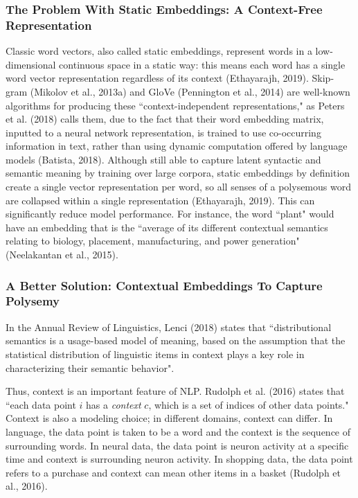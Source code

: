 \subsubsection{The Problem With Static Embeddings: A Context-Free Representation}

Classic word vectors, also called static embeddings, represent words in a low-dimensional continuous space in a static way: this means each word has a single word vector representation regardless of its context (Ethayarajh, 2019). Skip-gram (Mikolov et al., 2013a) and GloVe (Pennington et al., 2014) are well-known algorithms for producing these ``context-independent representations," as Peters et al. (2018) calls them, due to the fact that their word embedding matrix, inputted to a neural network representation, is trained to use co-occurring information in text, rather than using dynamic computation offered by language models (Batista, 2018). Although still able to capture latent syntactic and semantic meaning by training over large corpora, static embeddings by definition create a single vector representation per word, so all senses of a polysemous word are collapsed within a single representation (Ethayarajh, 2019). This can significantly reduce model performance. For instance, the word ``plant" would have an embedding that is the ``average of its different contextual semantics relating to biology, placement, manufacturing, and power generation" (Neelakantan et al., 2015). 

\subsubsection{A Better Solution: Contextual Embeddings To Capture Polysemy}

In the Annual Review of Linguistics, Lenci (2018) states that ``distributional semantics is a usage-based model of meaning, based on the assumption that the statistical distribution of linguistic items in context plays a key role in characterizing their semantic behavior".

Thus, context is an important feature of NLP. Rudolph et al. (2016) states that ``each data point $i$ has a \emph{context} $c$, which is a set of indices of other data points." Context is also a modeling choice; in different domains, context can differ. In language, the data point is taken to be a word and the context is the sequence of surrounding words. In neural data, the data point is neuron activity at a specific time and context is surrounding neuron activity. In shopping data, the data point refers to a purchase and context can mean other items in a basket (Rudolph et al., 2016). 

